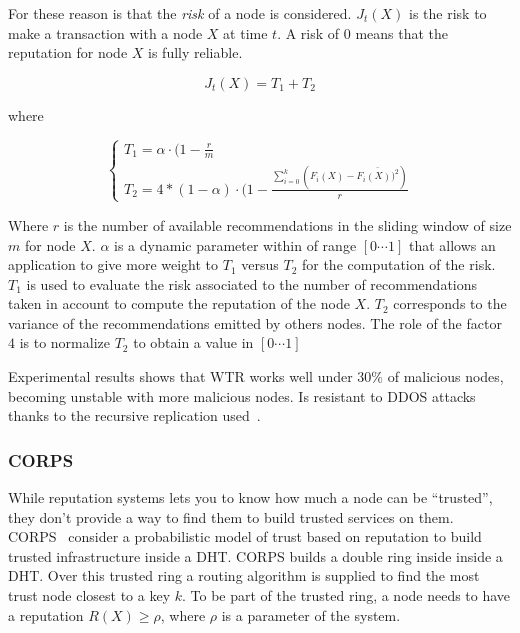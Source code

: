For these reason is that the \textit{risk} of a node is considered. $J_t(X)$ is
the risk to make a transaction with a node $X$ at time $t$. A risk of 0
means that the reputation for node $X$ is fully reliable.

\begin{equation}
  J_t(X) =  T_1 + T_2
\end{equation}

where

\begin{equation}
  \left\{
  \begin{array}{l}
    T_1 = \alpha \cdot (1-\frac{r}{m}\\
    T_2 = 4 * (1- \alpha) \cdot (1-\frac{\sum_{i=0}^{k} (F_i(X)-\bar{F_i(X))^2})}{r}
  \end{array}\right.
\end{equation}

Where $r$ is the number of available recommendations in the sliding window of
size $m$ for node $X$. $\alpha$ is a dynamic parameter within of range
$[0\cdots 1]$ that allows an application to give more weight to $T_1$ versus
$T_2$ for the computation of the risk. $T_1$ is used to evaluate the risk
associated to the number of recommendations taken in account to compute the
reputation of the node $X$. $T_2$ corresponds to the variance of the
recommendations emitted by others nodes. The role of the factor $4$ is to
normalize $T_2$ to obtain a value in $[0\cdots 1]$

Experimental results shows that WTR works well under $30\%$ of malicious nodes,
becoming unstable with more malicious nodes. Is resistant to DDOS attacks
thanks to the recursive replication used~\cite{recursive_replication}.

\subsubsection{CORPS}
\label{sec:corps}
While reputation systems lets you to know how much a node can be
``trusted'', they don't provide a way to find them to build trusted services on
them. CORPS~\cite{rosas2011corps} consider a probabilistic model of trust based on
reputation to build trusted infrastructure inside a DHT. CORPS builds a double
ring inside inside a DHT. Over this trusted ring a routing algorithm is supplied to
find the most trust node closest to a key $k$.
To be part of the trusted ring, a node needs to have a reputation $R(X) \ge
\rho$, where $\rho$ is a parameter of the system. 

